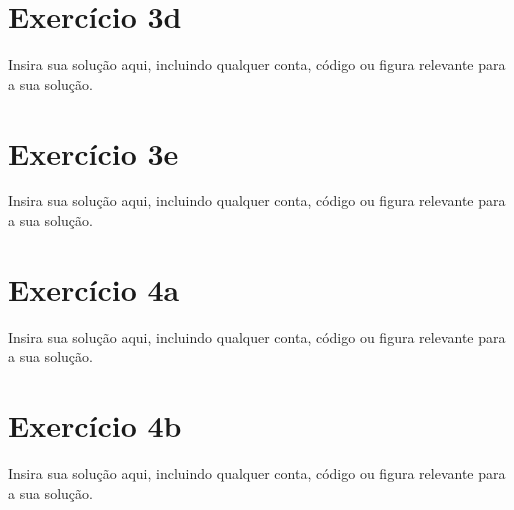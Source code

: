 \documentclass[11pt]{article}
\begin{document}
\newpage

\section{Exercício 3d}
Insira sua solução aqui, incluindo qualquer conta, código ou figura relevante para a sua solução.

\newpage

\section{Exercício 3e}
Insira sua solução aqui, incluindo qualquer conta, código ou figura relevante para a sua solução.

\newpage


\section{Exercício 4a}
Insira sua solução aqui, incluindo qualquer conta, código ou figura relevante para a sua solução.

\newpage

\section{Exercício 4b}
Insira sua solução aqui, incluindo qualquer conta, código ou figura relevante para a sua solução.
\end{document}
